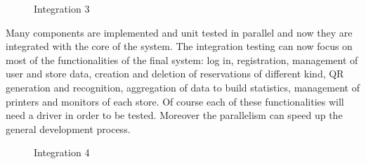 \begin{figure}[H]
	\noindent
	\caption{Integration 3} %
\end{figure}
Many components are implemented and unit tested in parallel and now they are integrated with the core of the system. The integration testing can now focus on most of the functionalities of the final system: log in, registration, management of user and store data, creation and deletion of reservations of different kind, QR generation and recognition, aggregation of data to build statistics, management of printers and monitors of each store. Of course each of these functionalities will need a driver in order to be tested. Moreover the parallelism can speed up the general development process.
\begin{figure}[H]
	\noindent
	\caption{Integration 4} %
\end{figure}
